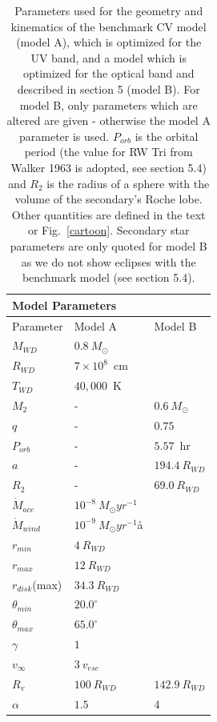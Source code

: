 \documentclass[preprint, a4paper, 11pt]{aastex}
\begin{document}
\begin{table}
\centering
\begin{tabular}{p{2cm}p{2cm}p{2cm}}
\multicolumn{2}{|l|}{Model Parameters}  \\
\hline Parameter 	&	 Model A  & Model B \\ 
\hline \hline 
$M_{WD}$ 	 &	 $0.8~M_{\odot}$  &     \\ 
$R_{WD}$ 	 &	 $7\times10^{8}$~cm  & \\ 
$T_{WD}$ 	 &	 $40,000$~K        &  \\
$M_{2}$ 	& -&	 $0.6~M_{\odot}$   \\ 
$q$ 	&- &	 $0.75$   \\ 
$P_{orb}$ 	&- &	 $5.57$~hr   \\ 
$a$ 	& -&	 $194.4~R_{WD}$   \\ 
$R_2$   &   -  &	 $69.0~R_{WD}$  \\ 
$\dot{M}_{acc}$ 	 &	 $10^{-8}~M_{\odot}yr^{-1}$  &\\ 
$\dot{M}_{wind}$  &	$10^{-9}~M_{\odot}yr^{-1}$å  & \\ 
$r_{min}$ 	&	 $4~R_{WD}$ &  \\ 
$r_{max}$ 	&	 $12~R_{WD}$  &  \\ 
$r_{disk}$(max) 	&	 $34.3~R_{WD}$  &  \\ 
$\theta_{min}$ 	&	 $20.0^{\circ}$  &  \\ 
$\theta_{max}$ 	&	 $65.0^{\circ}$  &  \\ 
$\gamma$ 	&	 $1$  &  \\ 
$v_{\infty}$ 	&	 $3~v_{esc}$  &  \\ 
$R_v$ 	        &	 $100~R_{WD}$  &  $142.9~R_{WD}$  \\ 
$\alpha$ 	&	 $1.5$   &   $4$\\
\end{tabular}
\centering
\caption{
Parameters used for the geometry and kinematics of the benchmark 
CV model (model A), which is optimized for the UV band, and a model
which is optimized for the optical band and described in section 5 (model B).
For model B, only parameters which are altered are given - otherwise the
model A parameter is used. $P_{orb}$ is the orbital period 
(the value for RW Tri from Walker 1963 is adopted, see section 5.4) and 
$R_2$ is the radius of a sphere with the volume of the secondary's Roche lobe. 
Other quantities are defined in the text or Fig.~\ref{cartoon}.
Secondary star parameters are only quoted for 
model B as we do not show eclipses with the 
benchmark model (see section 5.4).
}
\label{wind_param}
\label{modelb_table}
\end{table}
\end{document}
